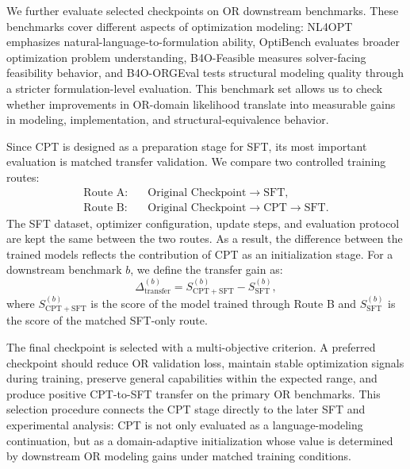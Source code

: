 We further evaluate selected checkpoints on OR downstream benchmarks. These
benchmarks cover different aspects of optimization modeling: NL4OPT emphasizes
natural-language-to-formulation ability, OptiBench evaluates broader
optimization problem understanding, B4O-Feasible measures solver-facing
feasibility behavior, and B4O-ORGEval tests structural modeling quality through
a stricter formulation-level evaluation. This benchmark set allows us to check
whether improvements in OR-domain likelihood translate into measurable gains in
modeling, implementation, and structural-equivalence behavior.

Since CPT is designed as a preparation stage for SFT, its most important
evaluation is matched transfer validation. We compare two controlled training
routes:
\begin{align}
\text{Route A:}\quad & \text{Original Checkpoint} \rightarrow \text{SFT}, \\
\text{Route B:}\quad & \text{Original Checkpoint} \rightarrow \text{CPT} \rightarrow \text{SFT}.
\end{align}
The SFT dataset, optimizer configuration, update steps, and evaluation protocol
are kept the same between the two routes. As a result, the difference
between the trained models reflects the contribution of CPT as an initialization
stage. For a downstream benchmark \(b\), we define the transfer gain as:
\begin{equation}
\Delta_{\mathrm{transfer}}^{(b)}
=
S_{\mathrm{CPT+SFT}}^{(b)}
-
S_{\mathrm{SFT}}^{(b)} ,
\end{equation}
where \(S_{\mathrm{CPT+SFT}}^{(b)}\) is the score of the model trained through
Route B and \(S_{\mathrm{SFT}}^{(b)}\) is the score of the matched SFT-only
route.

The final checkpoint is selected with a multi-objective criterion. A preferred
checkpoint should reduce OR validation loss, maintain stable optimization
signals during training, preserve general capabilities within the expected
range, and produce positive CPT-to-SFT transfer on the primary OR benchmarks.
This selection procedure connects the CPT stage directly to the later SFT and
experimental analysis: CPT is not only evaluated as a language-modeling
continuation, but as a domain-adaptive initialization whose value is determined
by downstream OR modeling gains under matched training conditions.


